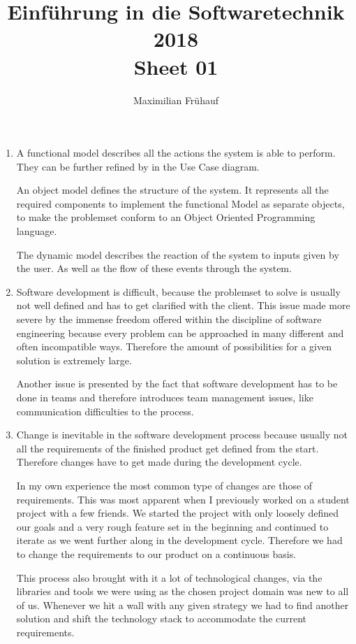 \documentclass[a4paper, 10pt]{article}
\title{Einführung in die Softwaretechnik 2018 \\ Sheet 01}
\author{Maximilian Frühauf}
\begin{document}
\maketitle

\begin{enumerate}
	\item
	      A functional model describes all the actions the system is
	      able to perform. They can be further refined by in the Use Case diagram.

	      An object model defines the structure of the system.
	      It represents all the required components to implement the functional Model
	      as separate objects, to make the problemset conform to an Object Oriented Programming language.

	      The dynamic model describes the reaction of the system to inputs given by the
		user. As well as the flow of these events through the system.

	\item
	      Software development is difficult, because the problemset to solve is
	      usually not well defined and has to get clarified with the client.
	      This issue made more severe by the immense freedom offered within the discipline of
	      software engineering because every problem can be approached in many different and often incompatible ways.
	      Therefore the amount of possibilities for a given solution is extremely large.

	      Another issue is presented by the fact that software development has to be
	      done in teams and therefore introduces team management issues, like communication
	      difficulties to the process.
	\item
	      Change is inevitable in the software development process because usually not all
	      the requirements of the finished product get defined from the start. Therefore changes have
	      to get made during the development cycle.

	      In my own experience the most common type of changes are those of requirements.
	      This was most apparent when I previously worked on a student project with a few friends.
	      We started the project with only loosely defined our goals and a very rough feature set
	      in the beginning and continued to iterate as we went further along in the development cycle.
	      Therefore we had to change the requirements to our product on a continuous basis.

	      This process also brought with it a lot of technological changes, via the libraries and tools we
	      were using as the chosen project domain was new to all of us. Whenever we hit a wall with any given strategy
	      we had to find another solution and shift the technology stack to accommodate the current requirements.


\end{enumerate}
\end{document}
